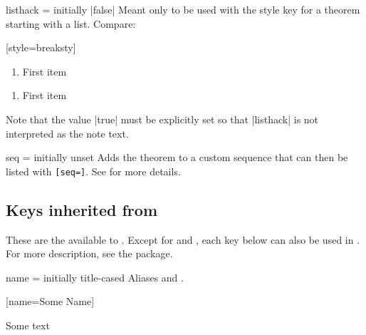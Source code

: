 \documentclass{ltxdoc}
\newcommand{\bracks}[1]{\texttt{[#1]}}
\begin{document}
\begin{docKey}{listhack}
  {=\textbar{}}
  {initially |false|}
Meant only to be used with the  style key for a theorem starting with a list.
Compare:

\begin{tcbwritetemp}
[style=breaksty]
\end{tcbwritetemp}

\begin{keythmscode}[withpreamble]
\begin{observation}
\begin{enumerate}
\item First item
\end{enumerate}
\end{observation}

\begin{observation}[listhack=true]
\begin{enumerate}
\item First item
\end{enumerate}
\end{observation}
\end{keythmscode}

Note that the value |true| must be explicitly set so that |listhack| is not interpreted as the note text.
\end{docKey}

\begin{docKey}[][doc label=thm/seq]{seq}
  {=}
  {initially unset}
Adds the theorem to a custom sequence  that can then be listed with \bracks{seq=}.
See  for more details.
\end{docKey}

\subsection{Keys inherited from } \label{thm-thmtools-keys}

These are the  available to .
Except for  and , each key below can also be used in .
For more description, see the \href{https://ctan.org/pkg/thmtools}{} package.

\begin{docKey}[][doc label=thm/name]{name}
  {=}
  {initially title-cased }
Aliases  and .

\begin{tcbwritetemp}
[name=Some Name]
\end{tcbwritetemp}

\begin{keythmscode}[withpreamble]
\begin{mythm}
Some text
\end{mythm}
\end{keythmscode}

\end{docKey}
\end{document}
